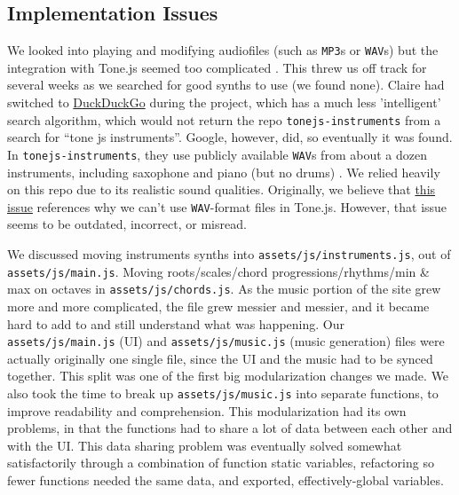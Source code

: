 \documentclass[12pt,a4paper]{article}
\newcommand{\code}{\texttt}
\newcommand{\lightcode}[1]{\colorbox{light-gray}{\texttt{#1}}}
\begin{document}
\subsection{Implementation Issues}

We looked into playing and modifying audiofiles (such as \code{MP3}s or \code{WAV}s) but the integration with Tone.js seemed too complicated \cite{tonejs-issue}. This threw us off track for several weeks as we searched for good synths to use (we found none). Claire had switched to \href{https://duckduckgo.com/}{DuckDuckGo} during the project, which has a much less 'intelligent' search algorithm, which would not return the repo \lightcode{tonejs-instruments} from a search for ``tone js instruments''. Google, however, did, so eventually it was found. In \lightcode{tonejs-instruments}, they use publicly available \code{WAV}s from about a dozen instruments, including saxophone and piano (but no drums) \cite{tonejs-instruments}.  We relied heavily on this repo due to its realistic sound qualities. Originally, we believe that \href{https://github.com/Tonejs/Tone.js/issues/290}{this issue} references why we can't use \code{WAV}-format files in Tone.js. However, that issue seems to be outdated, incorrect, or misread.

We discussed moving instruments synths into \code{assets/js/instruments.js}, out of \code{assets/js/main.js}. Moving roots/scales/chord progressions/rhythms/min \& max on octaves in \code{assets/js/chords.js}. As the music portion of the site grew more and more complicated, the file grew messier and messier, and it became hard to add to and still understand what was happening. Our \code{assets/js/main.js} (UI) and \code{assets/js/music.js} (music generation) files were actually originally one single file, since the UI and the music had to be synced together. This split was one of the first big modularization changes we made. We also took the time to break up \code{assets/js/music.js} into separate functions, to improve readability and comprehension. This modularization had its own problems, in that the functions had to share a lot of data between each other and with the UI. This data sharing problem was eventually solved somewhat satisfactorily through a combination of function static variables, refactoring so fewer functions needed the same data, and exported, effectively-global variables.
\end{document}
